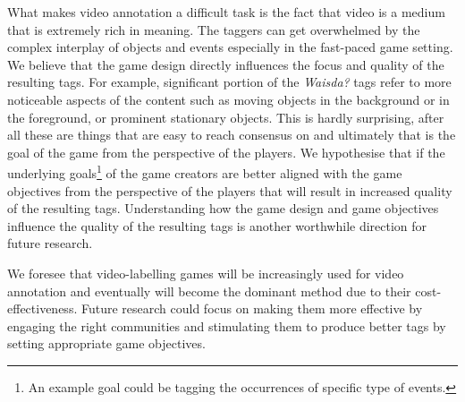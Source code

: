What makes video annotation a difficult task is the fact that video is a medium that is extremely rich in meaning. The taggers can get overwhelmed by the complex interplay of objects and events especially in the fast-paced game setting. We believe that the game design directly influences the focus and quality of the resulting tags. For example, significant portion of the \textit{Waisda?} tags refer to more noticeable aspects of the content such as moving objects in the background or in the foreground, or prominent stationary objects. This is hardly surprising, after all these are things that are easy to reach consensus on and ultimately that is the goal of the game from the perspective of the players. We hypothesise that if the underlying goals\footnote{An example goal could be tagging the occurrences of specific type of events.} of the game creators are better aligned with the game objectives from the perspective of the players that will result in increased quality of the resulting tags. Understanding how the game design and game objectives influence the quality of the resulting tags is another worthwhile direction for future research. 

We foresee that video-labelling games will be increasingly used for video annotation and eventually will become the dominant method due to their cost-effectiveness. Future research could focus on making them more effective by engaging the right communities and stimulating them to produce better tags by setting appropriate game objectives.  






 